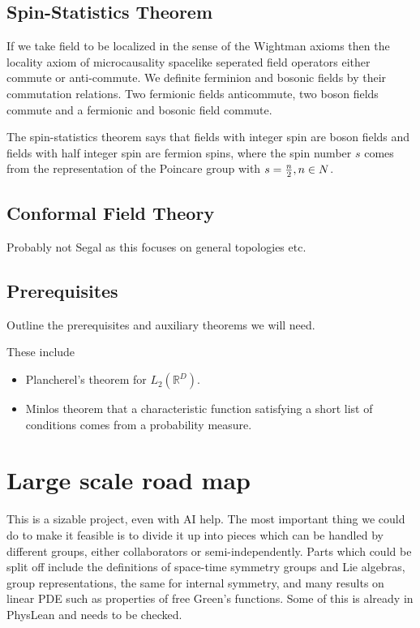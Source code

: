 \documentclass{article}
\newcommand{\1}{\mathbbm{1}}
\theoremstyle{plain}
\theoremstyle{definition}
\numberwithin{equation}{section}
\def\IR{\mathbb{R}}
\begin{document}
\subsection{Spin-Statistics Theorem}\label{spintheorem}

If we take field to be localized in the sense of the Wightman axioms then the locality axiom of microcausality spacelike seperated field operators either commute or anti-commute. We definite ferminion and bosonic fields by their commutation relations. Two fermionic fields anticommute, two boson fields commute and a fermionic and bosonic field commute. 

The spin-statistics theorem says that fields with integer spin are boson fields and fields with half integer spin are fermion spins, where the spin number $s$ comes from the representation of the Poincare group with $s= {n \over 2}, n \in N$. 


\subsection{Conformal Field Theory}

Probably not Segal as this focuses on general topologies etc. 


\subsection{Prerequisites}
Outline the prerequisites and auxiliary theorems we will need.

These include
\begin{itemize}
    \item Plancherel's theorem for $L_2(\IR^D)$.
    \item Minlos theorem that a characteristic function satisfying a short list of conditions comes from a probability measure.
\end{itemize}


\section{Large scale road map}

This is a sizable project, even with AI help.
The most important thing we could do to make it feasible is to divide it up into pieces
which can be handled by different groups, either collaborators or semi-independently.
Parts which could be split off include the definitions of space-time symmetry groups and Lie algebras,
group representations, the same for internal symmetry, and many results on linear PDE such as
properties of free Green's functions.  Some of this is already in PhysLean and needs to be checked.
\end{document}
